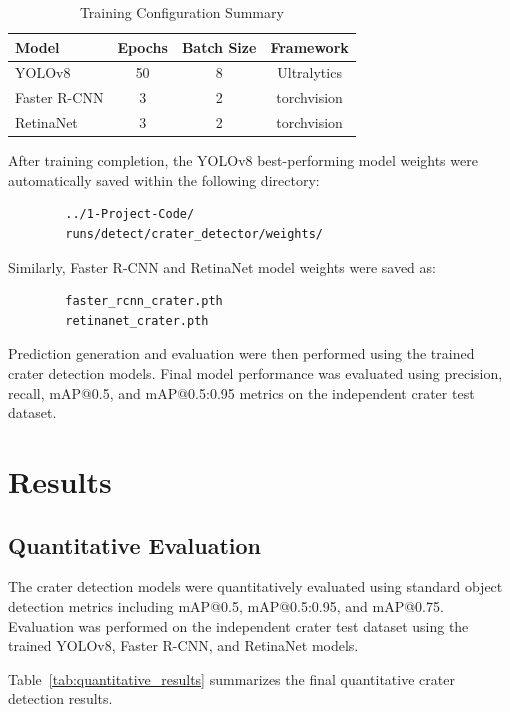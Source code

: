 \documentclass[conference]{IEEEtran}
\begin{document}
	\begin{table}[h]
		\centering
		\caption{Training Configuration Summary}
		\label{tab:training_config}
		
		\begin{tabular}{lccc}
			\toprule
			Model & Epochs & Batch Size & Framework \\
			\midrule
			YOLOv8 & 50 & 8 & Ultralytics \\
			Faster R-CNN & 3 & 2 & torchvision \\
			RetinaNet & 3 & 2 & torchvision \\
			\bottomrule
		\end{tabular}
		
	\end{table}
	
	After training completion, the YOLOv8 best-performing model weights were automatically saved within the following directory:
	
	\begin{verbatim}
		../1-Project-Code/
		runs/detect/crater_detector/weights/
	\end{verbatim}
	
	Similarly, Faster R-CNN and RetinaNet model weights were saved as:
	
	\begin{verbatim}
		faster_rcnn_crater.pth
		retinanet_crater.pth
	\end{verbatim}
	
	Prediction generation and evaluation were then performed using the trained crater detection models. Final model performance was evaluated using precision, recall, mAP@0.5, and mAP@0.5:0.95 metrics on the independent crater test dataset.
	
	\section{Results}
	
	\subsection{Quantitative Evaluation}
	
	The crater detection models were quantitatively evaluated using standard object detection metrics including mAP@0.5, mAP@0.5:0.95, and mAP@0.75. Evaluation was performed on the independent crater test dataset using the trained YOLOv8, Faster R-CNN, and RetinaNet models.
	
	Table~\ref{tab:quantitative_results} summarizes the final quantitative crater detection results.
	
\end{document}
